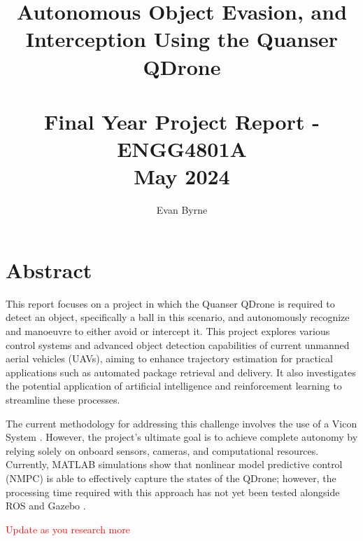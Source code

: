 \documentclass{UoNMCHA}
\numberwithin{equation}{section}
\begin{document}
\title{Autonomous Object Evasion, and Interception Using the Quanser QDrone\\ \ \\
{\small Final Year Project Report - ENGG4801A \\May 2024}}
\author[UoNMCHA]{Evan Byrne}
\address[UoNMCHA]{
Student of Mechatronics Engineering,\\
The University of Newcastle, Callaghan, NSW 2308, AUSTRALIA \\
Student Number: 3349681 \\
E-mail: \href{mailto:Evan.Byrne@uon.edu.au}{\textsf{Evan.Byrne@uon.edu.au}}}
\maketitle
\onecolumn

\vspace{-5mm}
\section*{Abstract}
\vspace{5mm}
This report focuses on a project in which the Quanser QDrone \cite{website:Quanser} is required to detect an object, specifically a ball in this scenario, and autonomously recognize and manoeuvre to either avoid or intercept it. This project explores various control systems and advanced object detection capabilities of current unmanned aerial vehicles (UAVs), aiming to enhance trajectory estimation for practical applications such as automated package retrieval and delivery. It also investigates the potential application of artificial intelligence and reinforcement learning to streamline these processes.

The current methodology for addressing this challenge involves the use of a Vicon System \cite{website:Vicon}. However, the project's ultimate goal is to achieve complete autonomy by relying solely on onboard sensors, cameras, and computational resources. Currently, MATLAB simulations show that nonlinear model predictive control (NMPC) \cite{website:NLMPC} is able to effectively capture the states of the QDrone; however, the processing time required with this approach has not yet been tested alongside ROS and Gazebo \cite{website:ROSandGazebo}.

\textcolor{red}{Update as you research more}

\newpage
\tableofcontents
\newpage
\end{document}
